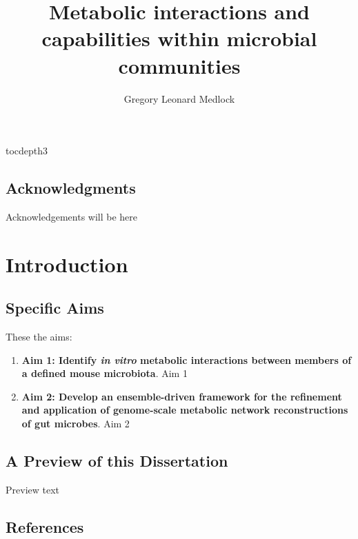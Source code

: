 \documentclass[11pt,twocolumn,notitlepage,openany,twoside]{book}
\title{Metabolic interactions and capabilities within microbial communities}
\author{Gregory Leonard Medlock}
\begin{document}
\frontmatter

\begingroup
\let\clearpage

\setcounter{tocdepth}{3}
\tableofcontents
\hspace{1.5cm}
\listoffigures
\hspace{1.5cm}
\listoftables

\endgroup

\clearpage
{}
\section*{Acknowledgments}

Acknowledgements will be here

\mainmatter


\chapter{Introduction}
\begin{refsection}

\section{Specific Aims}

These the aims:

\begin{enumerate}
  \item \textbf{Aim 1: Identify \textit{in vitro} metabolic interactions between members of a defined mouse microbiota}. Aim 1
  \item \textbf{Aim 2: Develop an ensemble-driven framework for the refinement and application of genome-scale metabolic network reconstructions of gut microbes}. Aim 2
\end{enumerate}



\section{A Preview of this Dissertation}

Preview text\cite{Song2005-mt}
\section{References}

\printbibliography[heading=none]
\end{refsection}
\end{document}
